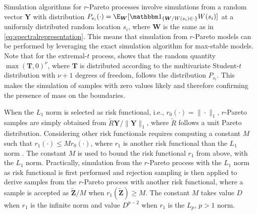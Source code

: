 \documentclass[12pt]{article}
\begin{document}
Simulation algorithms for $r$-Pareto processes \citep{Dombry.Engelke.Oesting:2016,Dombry.etal:2024} involve simulations from a random vector $\bm Y$ with distribution $P_{s_i}(\cdot) = \E_{\bm W}[\mathbbm 1_{\{\bm W/W(s_i)\in \cdot\}}W(s_i)]$ at a uniformly distributed random location $s_i$, where $\bm W$ is the same as in \eqref{eq:spectralrepresentation}.
%
This means that simulation from $r$-Pareto models can be performed by leveraging the exact simulation algorithm for max-stable models.  
%
Note that for the extremal-$t$ process, \citet[][Proposition~5]{Dombry.Engelke.Oesting:2016} shows that the random quantity $\max(\bm T,0)^\nu$, where $\bm T$ is distributed according to the multivariate Student-$t$ distribution with $\nu+1$ degrees of freedom, follows the distribution $P_{s_i}$. This makes the simulation of samples with zero values likely and therefore confirming the presence of mass on the boundaries. 

When the $L_1$ norm is selected as risk functional, i.e., $r_0(\cdot)=\|\cdot\|_1$, $r$-Pareto samples are simply obtained from $\tilde R\bm Y/\|\bm Y\|_1$, where $\tilde R$ follows a unit Pareto distribution.  
 Considering other risk functionals requires computing a constant $M$ such that $r_1 (\cdot) \leq Mr_0 (\cdot)$, where $r_1$ is another risk functional than the $L_1$ norm \citep[Proposition 2]{Dombry.etal:2024}. 
The constant $M$ is used to bound the risk functional $r_1$ from above, with the $L_1$ norm. Practically, simulation from the $r$-Pareto process with the $L_1$ norm as risk functional is first performed and rejection sampling is then applied to derive samples from the $r$-Pareto process with another risk functional, where a sample is accepted as $\bm{\tilde Z}/M$ when $r_1(\bm {\tilde Z})\geq M$. The constant $M$ takes value $D$ when $r_1$ is the infinite norm and value $D^{p-2}$ when $r_1$ is the $L_p$, $p>1$ norm.
\end{document}
